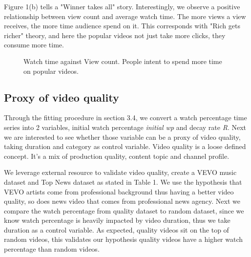 Figure 1(b) tells a "Winner takes all" story. Interestingly, we observe a positive relationship between view count and average watch time. The more views a view receives, the more time audience spend on it. This corresponds with "Rich gets richer" theory, and here the popular videos not just take more clicks, they consume more time.

\begin{figure}
\caption{Watch time against View count. People intent to spend more time on popular videos.}
\end{figure}

\subsection{Proxy of video quality}

Through the fitting procedure in section 3.4, we convert a watch percentage time series into 2 variables, initial watch percentage \textit{initial wp} and decay rate \textit{R}. Next we are interested to see whether those variable can be a proxy of video quality, taking duration and category as control variable. Video quality is a loose defined concept. It's a mix of production quality, content topic and channel profile.

We leverage external resource to validate video quality, create a VEVO music dataset and Top News dataset as stated in Table 1. We use the hypothesis that VEVO artists come from professional background thus having a better video quality, so does news video that comes from professional news agency. Next we compare the watch percentage from quality dataset to random dataset, since we know watch percentage is heavily impacted by video duration, thus we take duration as a control variable. As expected, quality videos sit on the top of random videos, this validates our hypothesis quality videos have a higher watch percentage than random videos.

